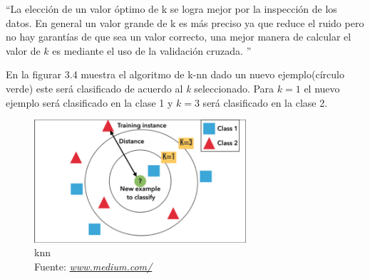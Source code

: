 \textquotedblleft La elección de un valor óptimo de k se logra mejor por la inspección de los datos. En general un valor grande de k es más preciso ya que reduce el ruido pero no hay garantías de que sea un valor correcto, una mejor manera de calcular el valor de $k$ es mediante el uso de la validación cruzada.
\textquotedblright \cite{WEBSITE:7}

En la figurar 3.4 muestra el algoritmo de k-nn dado un nuevo ejemplo(círculo verde) este será clasificado de acuerdo al \textit{k} seleccionado. Para $k=1$ el nuevo ejemplo será clasificado en la clase 1 y $k=3$ será clasificado en la clase 2.
 \begin{figure}[H]
 	\centering
 	\includegraphics[width=0.7\textwidth]{Figures/knn.png}
 	\caption{knn \\ Fuente:  \href{https://medium.com/@adi.bronshtein/a-quick-introduction-to-k-nearest-neighbors-algorithm-62214cea29c7}{\textit{www.medium.com/}}}
 	\label{knn}
 \end{figure} 
